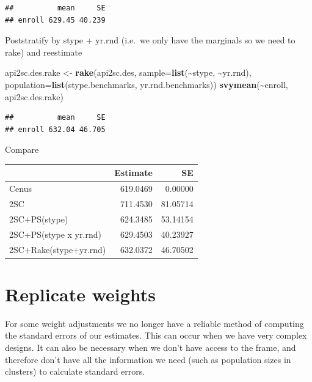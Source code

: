 \documentclass[
]{book}
\newenvironment{Shaded}{\begin{snugshade}}{\end{snugshade}}
\newcommand{\AttributeTok}[1]{\textcolor[rgb]{0.13,0.29,0.53}{#1}}
\newcommand{\FunctionTok}[1]{\textcolor[rgb]{0.13,0.29,0.53}{\textbf{#1}}}
\newcommand{\NormalTok}[1]{#1}
\newcommand{\OtherTok}[1]{\textcolor[rgb]{0.56,0.35,0.01}{#1}}
\newcommand{\SpecialCharTok}[1]{\textcolor[rgb]{0.81,0.36,0.00}{\textbf{#1}}}
\begin{document}
\begin{verbatim}
##          mean     SE
## enroll 629.45 40.239
\end{verbatim}

Poststratify by stype + yr.rnd (i.e.~we only have the marginals so we need to rake)
and reestimate

\begin{Shaded}
\begin{Highlighting}[]
\NormalTok{api2sc.des.rake }\OtherTok{\textless{}{-}} \FunctionTok{rake}\NormalTok{(api2sc.des, }
                        \AttributeTok{sample=}\FunctionTok{list}\NormalTok{(}\SpecialCharTok{\textasciitilde{}}\NormalTok{stype, }\SpecialCharTok{\textasciitilde{}}\NormalTok{yr.rnd), }
                        \AttributeTok{population=}\FunctionTok{list}\NormalTok{(stype.benchmarks, yr.rnd.benchmarks))}
\FunctionTok{svymean}\NormalTok{(}\SpecialCharTok{\textasciitilde{}}\NormalTok{enroll, api2sc.des.rake)}
\end{Highlighting}
\end{Shaded}

\begin{verbatim}
##          mean     SE
## enroll 632.04 46.705
\end{verbatim}

Compare

\begin{table}
\centering
\begin{tabular}[t]{l|r|r}
\hline
  & Estimate & SE\\
\hline
Cenus & 619.0469 & 0.00000\\
\hline
2SC & 711.4530 & 81.05714\\
\hline
2SC+PS(stype) & 624.3485 & 53.14154\\
\hline
2SC+PS(stype x yr.rnd) & 629.4503 & 40.23927\\
\hline
2SC+Rake(stype+yr.rnd) & 632.0372 & 46.70502\\
\hline
\end{tabular}
\end{table}

\section{Replicate weights}\label{replicate-weights}

For some weight adjustments we no longer have a reliable method of computing
the standard errors of our estimates. This can occur when we have very
complex designs. It can also be necessary when we don't have access to the frame,
and therefore don't have all the information we need (such as population sizes in clusters)
to calculate standard errors.
\end{document}
